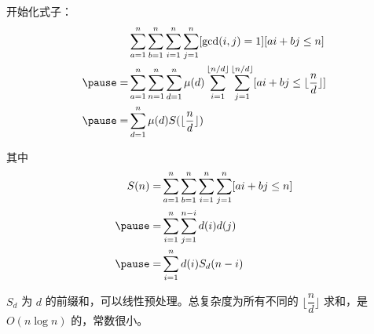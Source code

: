 \documentclass[../main.tex]{subfiles}
\begin{document}
\begin{frame}
开始化式子：
$$
\begin{aligned}
&\sum_{a=1}^n\sum_{b=1}^n\sum_{i=1}^n\sum_{j=1}^n[\gcd(i,j)=1][ai+bj\le n]\\ \pause
=&\sum_{a=1}^n\sum_{n=1}^n\sum_{d=1}^n\mu(d)\sum_{i=1}^{\lfloor n/d\rfloor}\sum_{j=1}^{\lfloor n/d\rfloor}[ai+bj\le \lfloor \frac{n}{d}\rfloor]\\ \pause
=&\sum_{d=1}^n\mu(d)S(\lfloor\frac{n}{d}\rfloor)
\end{aligned}
$$
\end{frame}

\begin{frame}
其中
$$
\begin{aligned}
S(n)=&\sum_{a=1}^n\sum_{b=1}^n\sum_{i=1}^n\sum_{j=1}^n[ai+bj\le n]\\ \pause
=&\sum_{i=1}^n\sum_{j=1}^{n-i}d(i)d(j)\\ \pause
=&\sum_{i=1}^nd(i)S_d(n-i)
\end{aligned}
$$\pause

$S_d$ 为 $d$ 的前缀和，可以线性预处理。总复杂度为所有不同的 $\lfloor\dfrac{n}{d}\rfloor$ 求和，是 $O(n\log n)$ 的，常数很小。
\end{frame}
\end{document}
